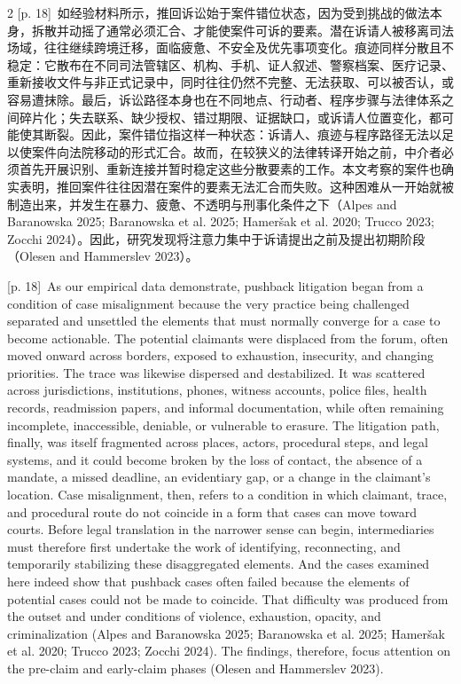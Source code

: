 \documentclass[10pt,a4paper]{article}
\begin{document}
\begin{paracol}{2}
{\scriptsize\color{gray} [p. 18]}\ 如经验材料所示，推回诉讼始于案件错位状态，因为受到挑战的做法本身，拆散并动摇了通常必须汇合、才能使案件可诉的要素。潜在诉请人被移离司法场域，往往继续跨境迁移，面临疲惫、不安全及优先事项变化。痕迹同样分散且不稳定：它散布在不同司法管辖区、机构、手机、证人叙述、警察档案、医疗记录、重新接收文件与非正式记录中，同时往往仍然不完整、无法获取、可以被否认，或容易遭抹除。最后，诉讼路径本身也在不同地点、行动者、程序步骤与法律体系之间碎片化；失去联系、缺少授权、错过期限、证据缺口，或诉请人位置变化，都可能使其断裂。因此，案件错位指这样一种状态：诉请人、痕迹与程序路径无法以足以使案件向法院移动的形式汇合。故而，在较狭义的法律转译开始之前，中介者必须首先开展识别、重新连接并暂时稳定这些分散要素的工作。本文考察的案件也确实表明，推回案件往往因潜在案件的要素无法汇合而失败。这种困难从一开始就被制造出来，并发生在暴力、疲惫、不透明与刑事化条件之下（Alpes and Baranowska 2025; Baranowska et al. 2025; Hameršak et al. 2020; Trucco 2023; Zocchi 2024）。因此，研究发现将注意力集中于诉请提出之前及提出初期阶段（Olesen and Hammerslev 2023）。\par
\switchcolumn
{\scriptsize\color{gray} [p. 18]}\ As our empirical data demonstrate, pushback litigation began from a condition of case misalignment because the very practice being challenged separated and unsettled the elements that must normally converge for a case to become actionable. The potential claimants were displaced from the forum, often moved onward across borders, exposed to exhaustion, insecurity, and changing priorities. The trace was likewise dispersed and destabilized. It was scattered across jurisdictions, institutions, phones, witness accounts, police files, health records, readmission papers, and informal documentation, while often remaining incomplete, inaccessible, deniable, or vulnerable to erasure. The litigation path, finally, was itself fragmented across places, actors, procedural steps, and legal systems, and it could become broken by the loss of contact, the absence of a mandate, a missed deadline, an evidentiary gap, or a change in the claimant’s location. Case misalignment, then, refers to a condition in which claimant, trace, and procedural route do not coincide in a form that cases can move toward courts. Before legal translation in the narrower sense can begin, intermediaries must therefore first undertake the work of identifying, reconnecting, and temporarily stabilizing these disaggregated elements. And the cases examined here indeed show that pushback cases often failed because the elements of potential cases could not be made to coincide. That difficulty was produced from the outset and under conditions of violence, exhaustion, opacity, and criminalization (Alpes and Baranowska 2025; Baranowska et al. 2025; Hameršak et al. 2020; Trucco 2023; Zocchi 2024). The findings, therefore, focus attention on the pre-claim and early-claim phases (Olesen and Hammerslev 2023).\par

\end{paracol}
\end{document}
